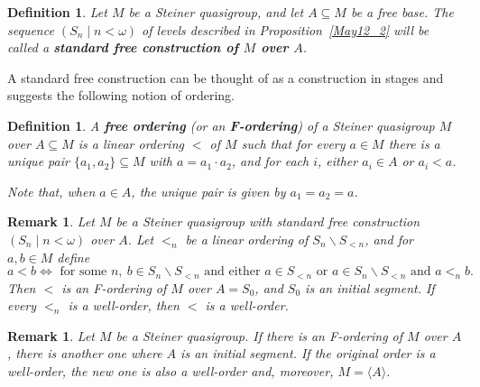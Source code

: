 \documentclass[a4paper, 11pt]{article}
\theoremstyle{note}
\newtheorem{df}[thm]{Definition}
\newtheorem{rmk}[thm]{Remark}
\begin{document}
		\begin{df} Let $M$ be a Steiner quasigroup, and let  $A\subseteq M$ be a free base. The sequence $(S_n\mid n<\omega)$ of levels described in Proposition~\ref{May12_2} will be called a \textbf{standard free construction of $M$ over $A$}.
	\end{df}

A standard free construction can be thought of as a construction in stages and suggests the following notion of ordering.
 
	\begin{df}
		A \textbf{free ordering}  (or an \textbf{F-ordering})   of a Steiner quasigroup $M$ over $A\subseteq M$ is a linear ordering $<$ of $M$ such that for every $a\in M$  there is a unique pair $\{a_1,a_2\}\subseteq M$ with $a=a_1\cdot a_2$,  and for each $i$, either $a_i\in A$ or $a_i<a$. 
		
		Note that, when $a\in A$, the unique pair is given by $a_1=a_2=a$.
	\end{df}
	
	\begin{rmk}\label{May12_12.0} Let $M$ be a Steiner quasigroup with standard free construction $(S_n\mid n<\omega)$ over $A$. Let $<_n$ be a linear ordering of $S_n\smallsetminus S_{<n}$, and for $a,b\in M$ define
	$$a<b \Leftrightarrow \mbox{ for some } n, \ b\in S_n\smallsetminus S_{<n} \mbox{ and either } a\in S_{<n} \mbox{ or } a\in S_n\smallsetminus S_{<n} \mbox{ and } a<_n b.  $$ 
		Then $<$ is an F-ordering of $M$ over $A=S_0$, and $S_0$ is an initial segment. If every $<_n$ is a well-order, then $<$ is a well-order.
		\end{rmk}
		
	\begin{rmk}\label{May12_12.1}
		 Let $M$ be a Steiner quasigroup. If there is an F-ordering of $M$ over $A$, there is another one where $A$ is an initial segment. If the original order is a well-order, the new one is also a well-order and, moreover, $M=\langle A\rangle$.
	\end{rmk}	
	
\end{document}
